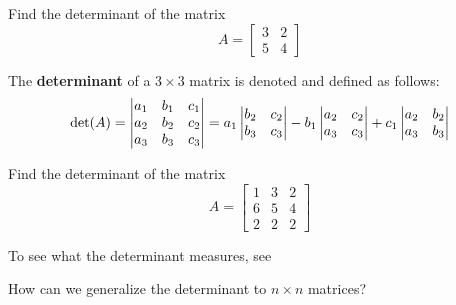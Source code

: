 \begin{example}
    Find the determinant of the matrix \begin{equation*}
A = 
\begin{bmatrix}
3 & 2 \\
5 & 4
\end{bmatrix}
\end{equation*}
\end{example}

\begin{definition}
    The \textbf{determinant} of a $3 \times 3$ matrix is denoted and defined as follows:
\begin{equation*}
\textnormal{det}(A) = 
\begin{vmatrix}
a_1 & b_1 & c_1 \\
a_2 & b_2 & c_2 \\
a_3 & b_3 & c_3 \\
\end{vmatrix} = a_1\begin{vmatrix}
b_2 & c_2 \\
b_3 & c_3
\end{vmatrix} - b_1\begin{vmatrix}
a_2 &  c_2 \\
a_3 &  c_3
\end{vmatrix} + c_1\begin{vmatrix}
a_2 & b_2 \\
a_3 & b_3 \\
\end{vmatrix}
\end{equation*}

    \end{definition}

\begin{example}\label{det3d}
    Find the determinant of the matrix \begin{equation*}
A = 
\begin{bmatrix}
1 & 3 & 2 \\
6 & 5 & 4 \\
2 & 2 & 2
\end{bmatrix}
\end{equation*}
\end{example}

To see what the determinant measures, see 


\begin{motivating}
How can we generalize the determinant to $n \times n$ matrices?
\end{motivating}

